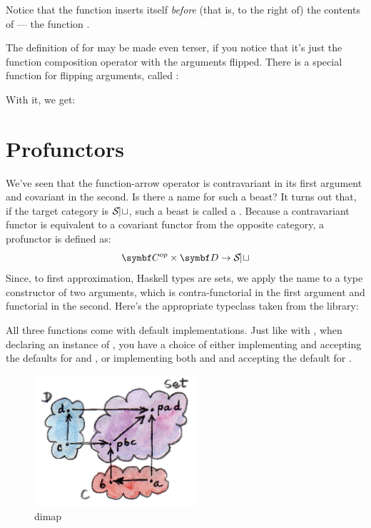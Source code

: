 Notice that the function  inserts itself \emph{before} (that
is, to the right of) the contents of  --- the function
.

The definition of  for  may be made even
terser, if you notice that it's just the function composition operator
with the arguments flipped. There is a special function for flipping
arguments, called :

With it, we get:


\section{Profunctors}

We've seen that the function-arrow operator is contravariant in its
first argument and covariant in the second. Is there a name for such a
beast? It turns out that, if the target category is $\mathcal{S\mkern-3mu et}$, such a
beast is called a . Because a contravariant functor is
equivalent to a covariant functor from the opposite category, a
profunctor is defined as:
\[\cat{C}^{op} \times \cat{D} \to \Set\]
Since, to first approximation, Haskell types are sets, we apply the name
 to a type constructor  of two arguments,
which is contra-functorial in the first argument and functorial in the
second. Here's the appropriate typeclass taken from the
 library:

All three functions come with default implementations. Just like with
, when declaring an instance of ,
you have a choice of either implementing  and accepting
the defaults for  and , or implementing both
 and  and accepting the default for
.

\begin{figure}[H]
\centering
\includegraphics[width=60mm]{images/dimap.jpg}
\caption{dimap}
\end{figure}

